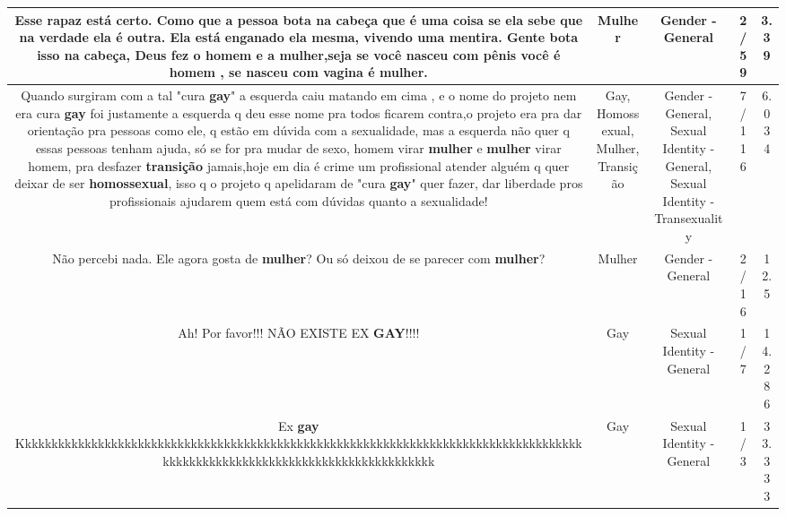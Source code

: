 \documentclass[11pt]{article}
\newlength\mylength
\begin{document}
\begin{center}
\begin{longtable}{|C{.65\mylength}|C{.30\mylength}|C{.12\mylength}|C{.12\mylength}|C{.12\mylength}|}
  \small Esse rapaz  está   certo. Como que a pessoa bota na cabeça  que é uma coisa se ela sebe que na verdade  ela é outra. Ela está  enganado ela mesma, vivendo uma mentira. Gente bota isso na cabeça, Deus fez  o homem  e a \textbf{mulher},seja se você  nasceu  com pênis  você  é  homem , se nasceu  com vagina é  \textbf{mulher}.\normalsize   & Mulher & Gender - General & 2/59 & 3.39 \\  \hline
  \small Quando surgiram com a tal "cura \textbf{gay}" a esquerda caiu matando em cima , e o nome do projeto nem era cura \textbf{gay} foi justamente a esquerda q deu esse nome pra todos ficarem contra,o projeto era  pra dar orientação pra pessoas como ele, q estão em dúvida com a sexualidade, mas a esquerda não quer q essas pessoas tenham ajuda, só se for pra mudar de sexo, homem virar \textbf{mulher} e \textbf{mulher} virar homem, pra desfazer \textbf{transição} jamais,hoje em dia é crime um profissional atender alguém q quer deixar de ser \textbf{homossexual}, isso q o projeto q apelidaram de "cura \textbf{gay}" quer fazer, dar liberdade pros profissionais ajudarem quem está com dúvidas quanto a sexualidade!\normalsize   & Gay, Homossexual, Mulher, Transição & Gender - General, Sexual Identity - General, Sexual Identity - Transexuality & 7/116 & 6.034 \\  \hline
  \small Não percebi nada. Ele agora gosta de \textbf{mulher}? Ou só deixou de se parecer com \textbf{mulher}?\normalsize   & Mulher & Gender - General & 2/16 & 12.5 \\  \hline
  \small Ah! Por favor!!! NÃO EXISTE EX \textbf{GAY}!!!!\normalsize   & Gay & Sexual Identity - General & 1/7 & 14.286 \\  \hline
  \small Ex \textbf{gay} Kkkkkkkkkkkkkkkkkkkkkkkkkkkkkkkkkkkkkkkkkkkkkkkkkkkkkkkkkkkkkkkkkkkkkkkkkkkkkkkkkkkkkkkkkkkkkkkkkkkkkkkkkkkkkkkkkkkkkkkkkkkkkk\normalsize   & Gay & Sexual Identity - General & 1/3 & 33.333 \\  \hline

\end{longtable}
\end{center}
\end{document}
